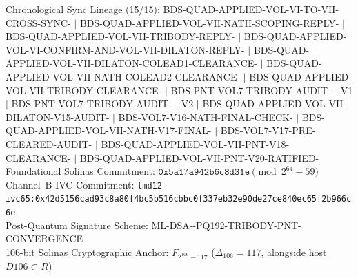 \documentclass[11pt,a4paper,reqno]{article}
\def\texttt#1{#1}%
\def\mathbb#1{#1}%
\def\Done{D106}%
\theoremstyle{plain}
\theoremstyle{definition}
\theoremstyle{remark}
\numberwithin{equation}{section}
\numberwithin{table}{section}
\newcommand{\R}{\mathbb{R}}
\newcommand{\Done}{\mathbb{D}_{106}}
\begin{document}
\begin{flushleft}
\texttt{Chronological Sync Lineage (15/15): BDS-\allowbreak QUAD-\allowbreak APPLIED-\allowbreak VOL-\allowbreak VI-\allowbreak TO-\allowbreak VII-\allowbreak CROSS-\allowbreak SYNC-\allowbreak 2026 $|$ BDS-\allowbreak QUAD-\allowbreak APPLIED-\allowbreak VOL-\allowbreak VII-\allowbreak NATH-\allowbreak SCOPING-\allowbreak REPLY-\allowbreak 2026 $|$ BDS-\allowbreak QUAD-\allowbreak APPLIED-\allowbreak VOL-\allowbreak VII-\allowbreak TRIBODY-\allowbreak REPLY-\allowbreak 2026 $|$ BDS-\allowbreak QUAD-\allowbreak APPLIED-\allowbreak VOL-\allowbreak VI-\allowbreak CONFIRM-\allowbreak AND-\allowbreak VOL-\allowbreak VII-\allowbreak DILATON-\allowbreak REPLY-\allowbreak 2026 $|$ BDS-\allowbreak QUAD-\allowbreak APPLIED-\allowbreak VOL-\allowbreak VII-\allowbreak DILATON-\allowbreak COLEAD1-\allowbreak CLEARANCE-\allowbreak 2026 $|$ BDS-\allowbreak QUAD-\allowbreak APPLIED-\allowbreak VOL-\allowbreak VII-\allowbreak NATH-\allowbreak COLEAD2-\allowbreak CLEARANCE-\allowbreak 2026 $|$ BDS-\allowbreak QUAD-\allowbreak APPLIED-\allowbreak VOL-\allowbreak VII-\allowbreak TRIBODY-\allowbreak CLEARANCE-\allowbreak 2026 $|$ BDS-\allowbreak PNT-\allowbreak VOL7-\allowbreak TRIBODY-\allowbreak AUDIT-\allowbreak 2026-\allowbreak 11-\allowbreak 22-\allowbreak V1 $|$ BDS-\allowbreak PNT-\allowbreak VOL7-\allowbreak TRIBODY-\allowbreak AUDIT-\allowbreak 2026-\allowbreak 11-\allowbreak 22-\allowbreak V2 $|$ BDS-\allowbreak QUAD-\allowbreak APPLIED-\allowbreak VOL-\allowbreak VII-\allowbreak DILATON-\allowbreak V15-\allowbreak AUDIT-\allowbreak 2026 $|$ BDS-\allowbreak VOL7-\allowbreak V16-\allowbreak NATH-\allowbreak FINAL-\allowbreak CHECK-\allowbreak 2026 $|$ BDS-\allowbreak QUAD-\allowbreak APPLIED-\allowbreak VOL-\allowbreak VII-\allowbreak NATH-\allowbreak V17-\allowbreak FINAL-\allowbreak 2026 $|$ BDS-\allowbreak VOL7-\allowbreak V17-\allowbreak PRE-\allowbreak CLEARED-\allowbreak AUDIT-\allowbreak 2026 $|$ BDS-\allowbreak QUAD-\allowbreak APPLIED-\allowbreak VOL-\allowbreak VII-\allowbreak PNT-\allowbreak V18-\allowbreak CLEARANCE-\allowbreak 2026 $|$ BDS-\allowbreak QUAD-\allowbreak APPLIED-\allowbreak VOL-\allowbreak VII-\allowbreak PNT-\allowbreak V20-\allowbreak RATIFIED-}\\
\texttt{Foundational Solinas Commitment: $\mathtt{0x5a17a942b6c8d31e} \pmod{2^{64}-59}$}\\[0.4ex]
\texttt{Channel~B IVC Commitment:} \nolinkurl{tmd12-ivc65:0x42d5156cad93c8a80f4bc5b516cbbc0f337eb32e90de27ce840ec65f2b966c6e}\\[0.4ex]
\texttt{Post-Quantum Signature Scheme:} \texttt{ML-\allowbreak DSA--\allowbreak PQ192-\allowbreak TRIBODY-\allowbreak PNT-\allowbreak CONVERGENCE}\\[0.4ex]
\texttt{106-bit Solinas Cryptographic Anchor: $\mathbb{F}_{2^{106}-117}$ ($\Delta_{106} = 117$, alongside host $\Done \subset \R$)}
\normalsize
\end{flushleft}
\end{document}
